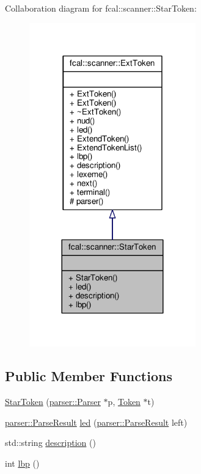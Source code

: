 Collaboration diagram for fcal\+:\+:scanner\+:\+:Star\+Token\+:
\nopagebreak
\begin{figure}[H]
\begin{center}
\leavevmode
\includegraphics[width=204pt]{classfcal_1_1scanner_1_1StarToken__coll__graph}
\end{center}
\end{figure}
\subsection*{Public Member Functions}
\begin{DoxyCompactItemize}
\item 
\hyperlink{classfcal_1_1scanner_1_1StarToken_a433855ee8677eeab179e361f48535aec}{Star\+Token} (\hyperlink{classfcal_1_1parser_1_1Parser}{parser\+::\+Parser} $\ast$p, \hyperlink{classfcal_1_1scanner_1_1Token}{Token} $\ast$t)
\item 
\hyperlink{classfcal_1_1parser_1_1ParseResult}{parser\+::\+Parse\+Result} \hyperlink{classfcal_1_1scanner_1_1StarToken_a6b11cdc86dbaba80202ebc5ad8939a01}{led} (\hyperlink{classfcal_1_1parser_1_1ParseResult}{parser\+::\+Parse\+Result} left)
\item 
std\+::string \hyperlink{classfcal_1_1scanner_1_1StarToken_ab7d27896f41f930e7a17126fc014d440}{description} ()
\item 
int \hyperlink{classfcal_1_1scanner_1_1StarToken_a20ae85b6c5a2ad7b7fb249974af2479d}{lbp} ()
\end{DoxyCompactItemize}
